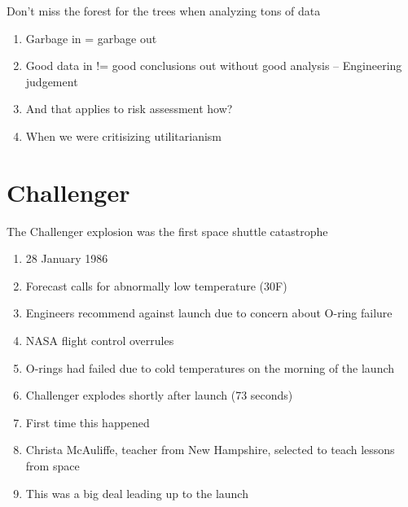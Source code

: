 \documentclass[aspectratio=1610,pdftex,dvipsnames,compress,xcolor={dvipsnames}]{beamer}
\begin{document}
\begin{frame}{Don't miss the forest for the trees when analyzing tons of data}
    \begin{enumerate}[series=outerlist,topsep=0pt,itemsep=21pt,leftmargin=*,label=(\arabic*)]
        \item[]Garbage in = garbage out
        \item[]Good data in != good conclusions out without good analysis -- Engineering judgement
        \item[]And that applies to risk assessment how?  
        \item[]When we were critisizing utilitarianism
    \end{enumerate}
\end{frame}


\section{Challenger}


\addtocounter{framenumber}{-1}
\begin{frame}{The Challenger explosion was the first space shuttle catastrophe}
    \begin{enumerate}[series=outerlist,topsep=0pt,itemsep=11pt,leftmargin=*,label=(\arabic*)]
        \item[]28 January 1986  
        \item[]Forecast calls for abnormally low temperature (30\degree F)   
        \item[]Engineers recommend against launch due to concern about O-ring failure
        \item[]NASA flight control overrules  
        \item[]O-rings had failed due to cold temperatures on the morning of the launch  
        \item[]Challenger explodes shortly after launch (73 seconds)  
        \item[]First time this happened  
        \item[]Christa McAuliffe, teacher from New Hampshire, selected to teach lessons from space
        \item[]This was a big deal leading up to the launch
    \end{enumerate}
\end{frame}
\end{document}
